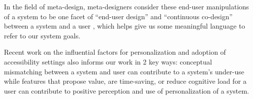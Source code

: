 In the field of meta-design, meta-designers consider these end-user manipulations of a system to be one facet of ``end-user design'' and ``continuous co-design'' between a system and a user \cite{Maceli2013}, which helps give us some meaningful language to refer to our system goals.

Recent work on the influential factors for personalization and adoption of accessibility settings \cite{Wood2023} also informs our work in 2 key ways: conceptual mismatching between a system and user can contribute to a system's under-use while features that propose value, are time-saving, or reduce cognitive load for a user can contribute to positive perception and use of personalization of a system.